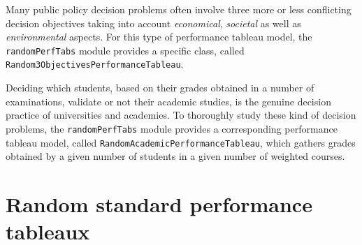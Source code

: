 Many public policy decision problems often involve three more or less conflicting decision objectives taking into account \emph{economical}, \emph{societal} as well as \emph{environmental} aspects. For this type of performance tableau model, the \texttt{randomPerfTabs} module provides a specific class, called \texttt{Random3ObjectivesPerformance\-Tableau}.

Deciding which students, based on their grades obtained in a number of examinations, validate or not their academic studies, is the genuine decision practice of universities and academies. To thoroughly study these kind of decision problems, the \texttt{randomPerfTabs} module provides a corresponding performance tableau model, called \texttt{RandomAcademic\-PerformanceTableau}, which gathers grades obtained by a given number of students in a given number of weighted courses.    
 
\section{Random standard performance tableaux}
\label{sec:6.2}
    
